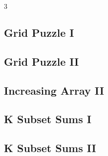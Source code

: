 \documentclass[8pt]{extarticle}
\begin{document}
\begin{multicols*}{3}
\subsection{Grid Puzzle I}
\begin{caixaenunciado}

\end{caixaenunciado}
\vspace{0.3cm}


\subsection{Grid Puzzle II}
\begin{caixaenunciado}

\end{caixaenunciado}
\vspace{0.3cm}


\subsection{Increasing Array II}
\begin{caixaenunciado}

\end{caixaenunciado}
\vspace{0.3cm}


\subsection{K Subset Sums I}
\begin{caixaenunciado}

\end{caixaenunciado}
\vspace{0.3cm}


\subsection{K Subset Sums II}
\begin{caixaenunciado}

\end{caixaenunciado}
\vspace{0.3cm}



\end{multicols*}
\end{document}
